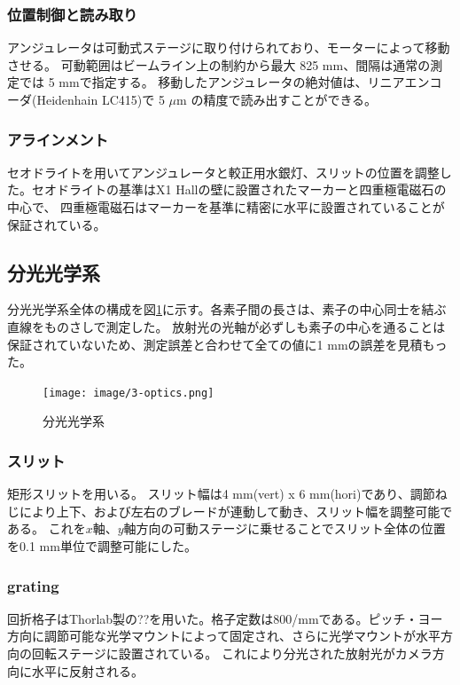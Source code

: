 \documentclass[a4paper,11pt,uplatex]{jsbook}
\begin{document}
\subsubsection{位置制御と読み取り}
アンジュレータは可動式ステージに取り付けられており、モーターによって移動させる。
可動範囲はビームライン上の制約から最大 825 mm、間隔は通常の測定では 5 mmで指定する。
移動したアンジュレータの絶対値は、リニアエンコーダ(Heidenhain LC415)で 5 $\mu \text{m}$ の精度で読み出すことができる。
\subsubsection{アラインメント}
セオドライトを用いてアンジュレータと較正用水銀灯、スリットの位置を調整した。セオドライトの基準はX1 Hallの壁に設置されたマーカーと四重極電磁石の中心で、
四重極電磁石はマーカーを基準に精密に水平に設置されていることが保証されている。
\subsection{分光光学系}
分光光学系全体の構成を図\ref{fig:optics}に示す。各素子間の長さは、素子の中心同士を結ぶ直線をものさしで測定した。
放射光の光軸が必ずしも素子の中心を通ることは保証されていないため、測定誤差と合わせて全ての値に1 mmの誤差を見積もった。
\begin{figure}
  \centering
  \texttt{[image: image/3-optics.png]}\\
  \caption{分光光学系}
  \label{fig:optics}
\end{figure}
\subsubsection{スリット}
矩形スリットを用いる。
スリット幅は4 mm(vert) x 6 mm(hori)であり、調節ねじにより上下、および左右のブレードが連動して動き、スリット幅を調整可能である。
これを$x$軸、$y$軸方向の可動ステージに乗せることでスリット全体の位置を0.1 mm単位で調整可能にした。
\subsubsection{grating}
回折格子はThorlab製の??を用いた。格子定数は800/mmである。ピッチ・ヨー方向に調節可能な光学マウントによって固定され、さらに光学マウントが水平方向の回転ステージに設置されている。
これにより分光された放射光がカメラ方向に水平に反射される。
\end{document}
